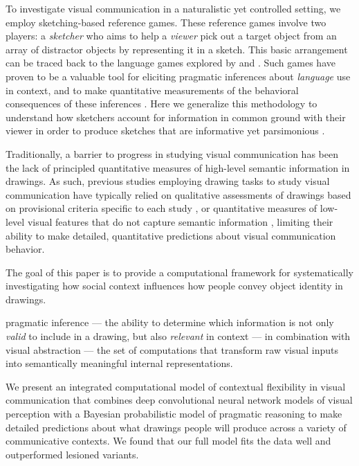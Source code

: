 \documentclass[9pt,twocolumn,twoside]{pnas-new}
\newcommand{\ndg}[1]{\textcolor{Green}{[ndg: #1]}}
\begin{document}
To investigate visual communication in a naturalistic yet controlled setting, we employ sketching-based reference games. 
These reference games involve two players: a \textit{sketcher} who aims to help a \textit{viewer} pick out a target object from an array of distractor objects by representing it in a sketch. 
This basic arrangement can be traced back to the language games explored by \citep{wittgenstein1953philosophical} and \citep{Lewis69_Convention}. 
Such games have proven to be a valuable tool for eliciting pragmatic inferences about \textit{language} use in context, and to make quantitative measurements of the behavioral consequences of these inferences \cite{goodman2016pragmatic,kao2014formalizing,goodman2013knowledge,frank2012predicting}. 
Here we generalize this methodology to understand how sketchers account for information in common ground with their viewer in order to produce sketches that are informative \cite{grice1975syntax,wilson1986relevance} yet parsimonious \cite{zipf1936psycho}.


Traditionally, a barrier to progress in studying visual communication has been the lack of principled quantitative measures of high-level semantic information in drawings. 
As such, previous studies employing drawing tasks to study visual communication have typically relied on qualitative assessments of drawings based on provisional criteria specific to each study \cite{Healey:2007vq}, or quantitative measures of low-level visual features that do not capture semantic information \cite{Garrod:2007wk}, limiting their ability to make detailed, quantitative predictions about visual communication behavior.

The goal of this paper is to provide a computational framework for systematically investigating how social context influences how people convey object identity in drawings. 

pragmatic inference \cite{goodman2016pragmatic,clark1996using,wilson1986relevance,grice1975syntax} --- the ability to determine which information is not only \textit{valid} to include in a drawing, but also \textit{relevant} in context --- in combination with visual abstraction --- the set of computations that transform raw visual inputs into semantically meaningful internal representations.

We present an integrated computational model of contextual flexibility in visual communication that combines deep convolutional neural network models of visual perception \cite{simonyan2014very,FanCommon2018} with a Bayesian probabilistic model of pragmatic reasoning \cite{goodman2016pragmatic} to make detailed predictions about what drawings people will produce across a variety of communicative contexts. 
We found that our full model fits the data well and outperformed lesioned variants.
\end{document}
